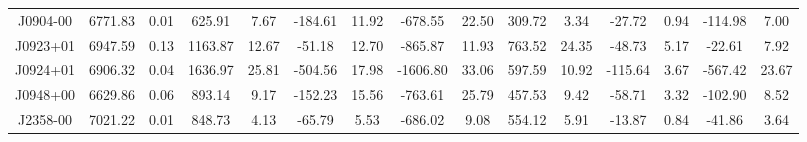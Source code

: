 \begin{table}
\begin{tabular}{ccccccccccccccc}
J0904-00 & 6771.83 & 0.01 & 625.91 & 7.67 & -184.61 & 11.92 & -678.55 & 22.50 & 309.72 & 3.34 & -27.72 & 0.94 & -114.98 & 7.00 \\
J0923+01 & 6947.59 & 0.13 & 1163.87 & 12.67 & -51.18 & 12.70 & -865.87 & 11.93 & 763.52 & 24.35 & -48.73 & 5.17 & -22.61 & 7.92 \\
J0924+01 & 6906.32 & 0.04 & 1636.97 & 25.81 & -504.56 & 17.98 & -1606.80 & 33.06 & 597.59 & 10.92 & -115.64 & 3.67 & -567.42 & 23.67 \\
J0948+00 & 6629.86 & 0.06 & 893.14 & 9.17 & -152.23 & 15.56 & -763.61 & 25.79 & 457.53 & 9.42 & -58.71 & 3.32 & -102.90 & 8.52 \\
J2358-00 & 7021.22 & 0.01 & 848.73 & 4.13 & -65.79 & 5.53 & -686.02 & 9.08 & 554.12 & 5.91 & -13.87 & 0.84 & -41.86 & 3.64 \\
\end{tabular}
\end{table}
